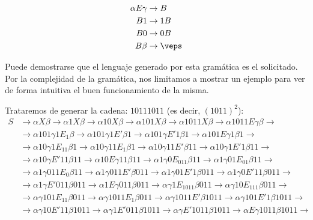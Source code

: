 \begin{ejercicio}
\begin{enumerate}
\begin{itemize}
                    \begin{align*}
                        \alpha E\gamma &\rightarrow B \\
                        B1 &\rightarrow 1B \\
                        B0 &\rightarrow 0B \\
                        B\beta &\rightarrow \veps 
                    \end{align*}
            \end{itemize}
            Puede demostrarse que el lenguaje generado por esta gramática es el solicitado. Por la complejidad de la gramática, nos limitamos a mostrar un ejemplo para ver de forma intuitiva el buen funcionamiento de la misma.

            Trataremos de generar la cadena: $10111011$ (es decir, ${(1011)}^{2}$):
            \begin{align*}
                S &\rightarrow \alpha X \beta \rightarrow \alpha 1X\beta \rightarrow \alpha 10X\beta \rightarrow \alpha101X \beta \rightarrow \alpha1011X\beta \rightarrow \alpha1011E\gamma\beta \rightarrow \\
                  &\rightarrow \alpha101\gamma1E_1\beta \rightarrow \alpha101\gamma1E'\beta1 \rightarrow \alpha101\gamma E'1\beta1 \rightarrow \alpha101E\gamma1\beta1 \rightarrow \\
                  &\rightarrow \alpha10\gamma1E_11\beta1 \rightarrow \alpha 10\gamma11E_1\beta1 \rightarrow \alpha 10\gamma11E'\beta11 \rightarrow \alpha10\gamma1E'1\beta11 \rightarrow \\
                  &\rightarrow \alpha10\gamma E'11\beta11 \rightarrow \alpha10E\gamma11\beta11 \rightarrow \alpha 1\gamma0E_011\beta11 \rightarrow \alpha1\gamma01E_01\beta11 \rightarrow\\
                  &\rightarrow\alpha1\gamma011E_0\beta11 \rightarrow \alpha1\gamma011E'\beta011 \rightarrow \alpha1\gamma01E'1\beta011 \rightarrow \alpha1\gamma0E'11\beta011 \rightarrow \\
                  &\rightarrow \alpha1\gamma E'011\beta011 \rightarrow \alpha1E\gamma011\beta011 \rightarrow \alpha\gamma1E_1011\beta011 \rightarrow \alpha\gamma10E_111\beta011 \rightarrow \\
                  &\rightarrow \alpha\gamma101E_11\beta011 \rightarrow \alpha\gamma1011E_1\beta011 \rightarrow \alpha\gamma1011E'\beta1011 \rightarrow \alpha\gamma101E'1\beta1011 \rightarrow \\
                  &\rightarrow \alpha\gamma10E'11\beta1011 \rightarrow \alpha\gamma1E'011\beta1011 \rightarrow \alpha\gamma E'1011\beta1011 \rightarrow \alpha E\gamma1011\beta1011 \rightarrow \\

\end{align*}
\end{enumerate}
\end{ejercicio}
